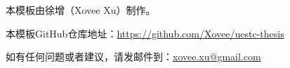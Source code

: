 \uestcacknowledgements

本模板由徐增（Xovee Xu）制作。

本模板GitHub仓库地址：\href{https://github.com/Xovee/uestc-thesis}{https://github.com/Xovee/uestc-thesis}

如有任何问题或者建议，请发邮件到：\href{mailto:xovee.xu@gmail.com}{xovee.xu@gmail.com}

